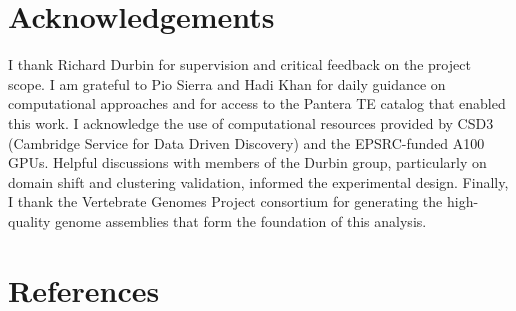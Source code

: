 \documentclass[12pt]{article}
\begin{document}
\newpage
\section*{Acknowledgements}

I thank Richard Durbin for supervision and critical feedback on the project scope. I am grateful to Pio Sierra and Hadi Khan for daily guidance on computational approaches and for access to the Pantera TE catalog that enabled this work. I acknowledge the use of computational resources provided by CSD3 (Cambridge Service for Data Driven Discovery) and the EPSRC-funded A100 GPUs. Helpful discussions with members of the Durbin group, particularly on domain shift and clustering validation, informed the experimental design. Finally, I thank the Vertebrate Genomes Project consortium for generating the high-quality genome assemblies that form the foundation of this analysis.

\newpage
\section*{References}
\end{document}
